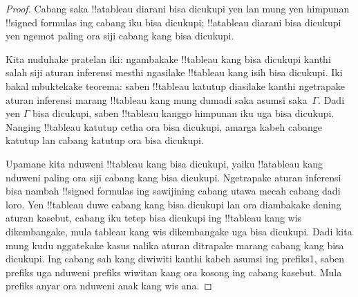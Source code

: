 \documentclass[../../../include/open-logic-section]{subfiles}
\begin{document}
\begin{proof}
Cabang saka !!a{tableau} diarani bisa dicukupi yen lan mung yen
himpunan !!{signed formula}s ing cabang iku bisa dicukupi; !!a{tableau}
diarani bisa dicukupi yen ngemot paling ora siji cabang kang bisa
dicukupi.

Kita nuduhake pratelan iki: ngambakake !!{tableau} kang bisa dicukupi
kanthi salah siji aturan inferensi mesthi ngasilake !!{tableau} kang
isih bisa dicukupi. Iki bakal mbuktekake teorema: saben !!{tableau}
katutup diasilake kanthi ngetrapake aturan inferensi marang
!!{tableau} kang mung dumadi saka asumsi saka~$\Gamma$. Dadi yen
$\Gamma$ bisa dicukupi, saben !!{tableau} kanggo himpunan iku uga bisa
dicukupi. Nanging !!{tableau} katutup cetha ora bisa dicukupi, amarga
kabeh cabange katutup lan cabang katutup ora bisa dicukupi.

Upamane kita nduweni !!{tableau} kang bisa dicukupi, yaiku
!!a{tableau} kang nduweni paling ora siji cabang kang bisa dicukupi.
Ngetrapake aturan inferensi bisa nambah !!{signed formula}s ing
sawijining cabang utawa mecah cabang dadi loro. Yen !!{tableau} duwe
cabang kang bisa dicukupi lan ora diambakake dening aturan kasebut,
cabang iku tetep bisa dicukupi ing !!{tableau} kang wis dikembangake,
mula tableau kang wis dikembangake uga bisa dicukupi. Dadi kita mung
kudu nggatekake kasus nalika aturan ditrapake marang cabang kang bisa
dicukupi. Ing cabang sah kang diwiwiti kanthi kabeh asumsi ing prefiks1, saben prefiks uga nduweni prefiks wiwitan kang ora kosong ing cabang kasebut. Mula prefiks anyar ora nduweni anak kang wis ana.


\end{proof}
\end{document}
